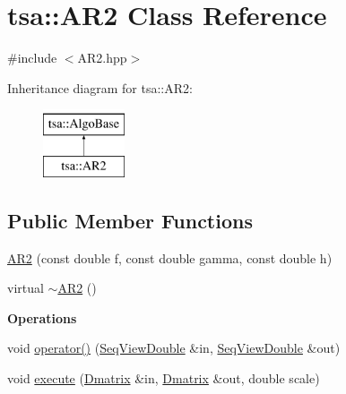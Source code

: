 \hypertarget{classtsa_1_1_a_r2}{}\section{tsa\+:\+:A\+R2 Class Reference}
\label{classtsa_1_1_a_r2}


{\ttfamily \#include $<$A\+R2.\+hpp$>$}

Inheritance diagram for tsa\+:\+:A\+R2\+:\begin{figure}[H]
\begin{center}
\leavevmode
\includegraphics[height=2.000000cm]{classtsa_1_1_a_r2}
\end{center}
\end{figure}
\subsection*{Public Member Functions}
\begin{DoxyCompactItemize}
\item 
\hyperlink{classtsa_1_1_a_r2_af98beea50a63f72e22af69e2f1843bc3}{A\+R2} (const double f, const double gamma, const double h)
\item 
virtual \hyperlink{classtsa_1_1_a_r2_a69e035a519d396ff2ef47759d6394117}{$\sim$\+A\+R2} ()
\end{DoxyCompactItemize}
\begin{Indent}\textbf{ Operations}\par
\begin{DoxyCompactItemize}
\item 
void \hyperlink{classtsa_1_1_a_r2_ac99c0344d5376911a0976a78c0f8a96f}{operator()} (\hyperlink{namespacetsa_ac599574bcc094eda25613724b8f3ca9e}{Seq\+View\+Double} \&in, \hyperlink{namespacetsa_ac599574bcc094eda25613724b8f3ca9e}{Seq\+View\+Double} \&out)
\item 
void \hyperlink{classtsa_1_1_a_r2_a5a3bc7f3a15baca56a2660fff78259f9}{execute} (\hyperlink{namespacetsa_ad260cd21c1891c4ed391fe788569aba4}{Dmatrix} \&in, \hyperlink{namespacetsa_ad260cd21c1891c4ed391fe788569aba4}{Dmatrix} \&out, double scale)
\end{DoxyCompactItemize}
\end{Indent}
